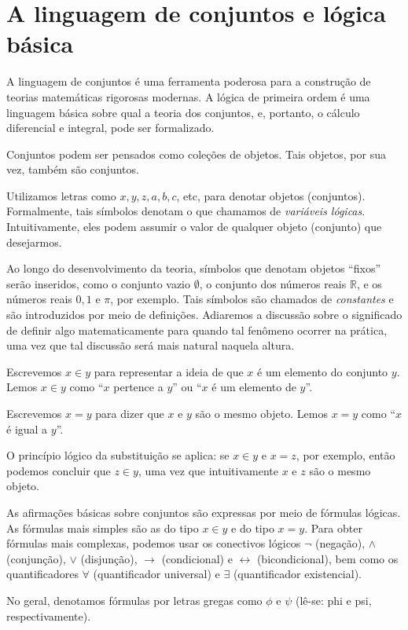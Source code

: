 \section{A linguagem de conjuntos e lógica básica}
A linguagem de conjuntos é uma ferramenta poderosa para a construção de teorias matemáticas rigorosas modernas.
A lógica de primeira ordem é uma linguagem básica sobre qual a teoria dos conjuntos, e, portanto, o cálculo diferencial e integral, pode ser formalizado.

Conjuntos podem ser pensados como coleções de objetos.
Tais objetos, por sua vez, também são conjuntos.

Utilizamos letras como $x, y, z, a, b, c$, etc, para denotar objetos (conjuntos).
Formalmente, tais símbolos denotam o que chamamos de \emph{variáveis lógicas}.
Intuitivamente, eles podem assumir o valor de qualquer objeto (conjunto) que desejarmos.

Ao longo do desenvolvimento da teoria, símbolos que denotam objetos ``fixos'' serão inseridos, como o conjunto vazio $\emptyset$, o conjunto dos números reais $\mathbb R$, e os números reais $0, 1$ e $\pi$, por exemplo.
Tais símbolos são chamados de \emph{constantes} e são introduzidos por meio de definições.
Adiaremos a discussão sobre o significado de definir algo matematicamente para quando tal fenômeno ocorrer na prática, uma vez que tal discussão será mais natural naquela altura.

Escrevemos $x\in y$ para representar a ideia de que $x$ é um elemento do conjunto $y$.
Lemos $x\in y$ como ``$x$ pertence a $y$'' ou ``$x$ é um elemento de $y$''.

Escrevemos $x=y$ para dizer que $x$ e $y$ são o mesmo objeto.
Lemos $x=y$ como ``$x$ é igual a $y$''.

O princípio lógico da substituição se aplica: se $x\in y$ e $x=z$, por exemplo, então podemos concluir que $z\in y$, uma vez que intuitivamente $x$ e $z$ são o mesmo objeto.

As afirmações básicas sobre conjuntos são expressas por meio de fórmulas lógicas.
As fórmulas mais simples são as do tipo $x\in y$ e do tipo $x=y$.
Para obter fórmulas mais complexas, podemos usar os conectivos lógicos $\neg$ (negação), $\wedge$ (conjunção), $\vee$ (disjunção), $\to$ (condicional) e $\leftrightarrow$ (bicondicional), bem como os quantificadores $\forall$ (quantificador universal) e $\exists$ (quantificador existencial).

No geral, denotamos fórmulas por letras gregas como $\phi$ e $\psi$ (lê-se: phi e psi, respectivamente).

